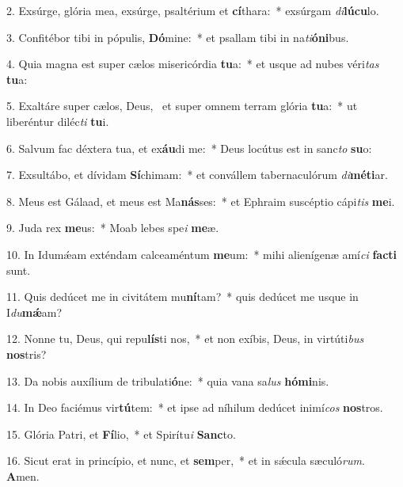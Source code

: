 2. Exsúrge, glória mea, exsúrge, psaltérium et \textbf{cí}thara:~*  exsúrgam \textit{di}\textbf{lú}\textbf{cu}lo.\

3. Confitébor tibi in pópulis, \textbf{Dó}mine:~*  et psallam tibi in na\textit{ti}\textbf{ó}\textbf{ni}bus.\

4. Quia magna est super cælos misericórdia \textbf{tu}a:~*  et usque ad nubes véri\textit{tas} \textbf{tu}a:\

5. Exaltáre super cælos, Deus, \dag\  et super omnem terram glória \textbf{tu}a:~*  ut liberéntur diléc\textit{ti} \textbf{tu}i.\

6. Salvum fac déxtera tua, et ex\textbf{áu}di me:~*  Deus locútus est in sanc\textit{to} \textbf{su}o:\

7. Exsultábo, et dívidam \textbf{Sí}chimam:~*  et convállem tabernaculórum \textit{di}\textbf{mé}\textbf{ti}ar.\

8. Meus est Gálaad, et meus est Ma\textbf{nás}ses:~*  et Ephraim suscéptio cápi\textit{tis} \textbf{me}i.\

9. Juda rex \textbf{me}us:~*  Moab lebes spe\textit{i} \textbf{me}æ.\

10. In Idumǽam exténdam calceaméntum \textbf{me}um:~*  mihi alienígenæ amí\textit{ci} \textbf{fac}\textbf{ti} sunt.\

11. Quis dedúcet me in civitátem mu\textbf{ní}tam?~*  quis dedúcet me usque in I\textit{du}\textbf{mǽ}am?\

12. Nonne tu, Deus, qui repu\textbf{lís}ti nos,~*  et non exíbis, Deus, in virtúti\textit{bus} \textbf{nos}tris?\

13. Da nobis auxílium de tribulati\textbf{ó}ne:~*  quia vana sa\textit{lus} \textbf{hó}\textbf{mi}nis.\

14. In Deo faciémus vir\textbf{tú}tem:~*  et ipse ad níhilum dedúcet inimí\textit{cos} \textbf{nos}tros.\

15. Glória Patri, et \textbf{Fí}lio,~*  et Spirítu\textit{i} \textbf{Sanc}to.\

16. Sicut erat in princípio, et nunc, et \textbf{sem}per,~*  et in sǽcula sæculó\textit{rum}. \textbf{A}men.\

